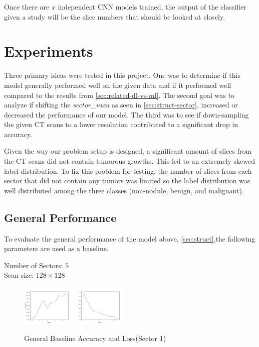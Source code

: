 \documentclass[10pt,twocolumn,letterpaper]{article}
\begin{document}
        Once there are $x$ independent CNN models trained, the output of the classifier given a study will
        be the slice numbers that should be looked at closely.

\section{Experiments} \label{sec:experiments}
   Three primary ideas were tested in this project. One was to determine if this model generally performed well on the given data and if it performed well
   compared to the results from \ref{sec:related-dl-vs-ml}. The second goal was to analyze if shifting the
   {\it sector\_num} as seen in \ref{sec:struct-sector}, increased or decreased the performance of our model. The third was to see if down-sampling the 
   given CT scans to a lower resolution contributed to a significant drop in accuracy.

   Given the way our problem setup is designed, a significant amount of slices from the CT scans did not contain tumorous growths. This led to an extremely
   skewed label distribution. To fix this problem for testing, the number of slices from each sector that did not contain any tumors was limited so the label
   distribution was well distributed among the three classes (non-nodule, benign, and malignant).

   \subsection{General Performance} \label{sec:experiments-general-performance}
      To evaluate the general performance of the model above, \ref{sec:struct},the following parameters are used as a baseline.

      \begin{center}
         Number of Sectors: $5$ \\
         Scan size: $128 \times 128$
      \end{center}
    
      \begin{figure}[h]
         \centering
         \includegraphics[width=0.23\textwidth]{./images/training_accuracy_5_sector_128_px.png}
         \includegraphics[width=0.23\textwidth]{./images/training_loss_5_sector_128_px.png}
         \caption{General Baseline Accuracy and Loss(Sector 1)}
         \label{fig:experiments-general-acc-loss}
      \end{figure}
    
\end{document}
